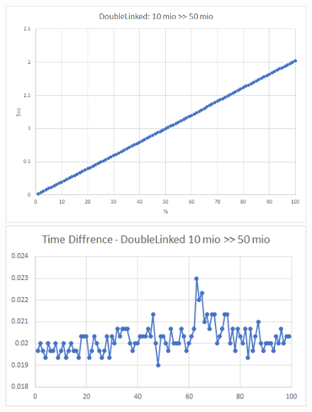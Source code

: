 \documentclass{TUBAFarbeiten}
\begin{document}
\begin{figure}[H]
\label{fig:Linked10-50}
\includegraphics[scale=0.9]{Linked10-50}
\begin{center}
\includegraphics[scale=1]{Linked10-50-Time}
\end{center}
\end{figure}
\end{document}
